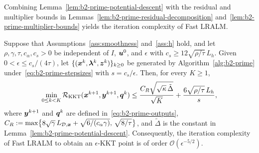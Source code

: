 Combining Lemma~\ref{lem:b2-prime-potential-descent} with the residual and
multiplier bounds in Lemmas~\ref{lem:b2-prime-residual-decomposition}
and~\ref{lem:b2-prime-multiplier-bounds} yields the iteration complexity of
Fast LRALM.

\begin{theorem}
\label{thm:b2-prime-complexity}
Suppose that Assumptions~\ref{ass:smoothness} and~\ref{ass:h} hold, and
let \(\rho,\gamma,\tau,c_\alpha,c_s>0\) be independent of \(I\), \(\bm{u}^0\), and
\(\epsilon\) with
\(c_s\ge12\sqrt{\rho/\tau}\,L_h\). Given \(0<\epsilon\le c_s/(4\tau)\),
let \(\{(\bm{x}^k,\bm{\lambda}^k,\bm{z}^k)\}_{k\ge0}\) be generated by
Algorithm~\ref{alg:b2-prime} under~\eqref{eq:b2-prime-stepsizes} with
\(s=c_s/\epsilon\). Then,
for every \(K\ge1\),
\begin{equation}
    \min_{0\le k<K}\mathcal R_{\mathrm{KKT}}(\bm{x}^{k+1},\bm{y}^{k+1},\bm{q}^k)
    \le\frac{C_R\sqrt{\sqrt{\kappa}\,\tilde{\Delta}}}{\sqrt{K}}
    +\frac{6\sqrt{\rho/\tau}\,L_h}{s},
    \label{eq:b2-prime-rate}
\end{equation}
where \(\bm{y}^{k+1}\) and \(\bm{q}^k\) are defined in~\eqref{eq:b2-prime-outputs},
\(C_R:=\max\bigl\{8\sqrt{\gamma}\,L_{\mathcal{D},\bm{x}}+\sqrt{6/(c_\alpha\gamma)},\,
\sqrt{8/\tau}\bigr\}\), and \(\tilde{\Delta}\) is the constant in
Lemma~\ref{lem:b2-prime-potential-descent}. Consequently, the iteration complexity of Fast LRALM to obtain an \(\epsilon\)-KKT point is of order
\(\mathcal O(\epsilon^{-5/2})\).
\end{theorem}
